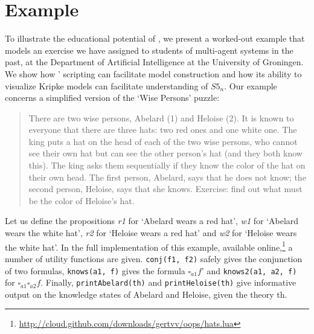 \section{Example}
\label{sec:example}

To illustrate the educational potential of \oops\/, we present a worked-out example that models an exercise we have assigned to students of multi-agent systems in the past, at the Department of Artificial Intelligence at the University of Groningen.
We show how \oops' scripting can facilitate model construction and how its ability to visualize Kripke models can facilitate understanding of $S5_n$.
Our example concerns a simplified version of the `Wise Persons' puzzle:

\begin{quote}
There are two wise persons, Abelard (1) and Heloise (2). It is known to everyone that there are three hats: two red ones and one white one. The king puts a hat on the head of each of the two wise persons, who cannot see their own hat but can see the other person's hat (and they both know this). The king asks them sequentially if they know the color of the hat on their own head. The first person, Abelard, says that he does not know; the second person, Heloise, says that she knows.
Exercise: find out what must be the color of Heloise's hat.
\end{quote}

Let us define the propositions {\it r1} for `Abelard wears a red hat', {\it w1} for `Abelard wears the white hat', {\it r2} for `Heloise wears a red hat' and {\it w2} for `Heloise wears the white hat'.
In the full implementation of this example, available online,\footnote{\url{http://cloud.github.com/downloads/gertvv/oops/hats.lua}} a number of utility functions are given.
{\tt conj(f1, f2)} safely gives the conjunction of two formulas, {\tt knows(a1, f)} gives the formula $\square_{a1} f$' and {\tt knows2(a1, a2, f)} for $\square_{a1} \square_{a2} f$.
Finally, {\tt printAbelard(th)} and {\tt printHeloise(th)} give informative output on the knowledge states of Abelard and Heloise, given the theory th.

